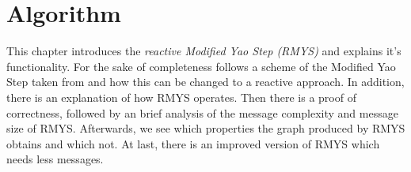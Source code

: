 %
%
\section{Algorithm}
This chapter introduces the \emph{reactive Modified Yao Step (RMYS)} and explains it's functionality.
For the sake of completeness follows a scheme of the Modified Yao Step taken from \cite{kanj} and how this can be changed to a reactive approach.
In addition, there is an explanation of how RMYS operates.
Then there is a proof of correctness, followed by an brief analysis of the message complexity and message size of RMYS.
Afterwards, we see which properties the graph produced by RMYS obtains and which not.
At last, there is an improved version of RMYS which needs less messages.


